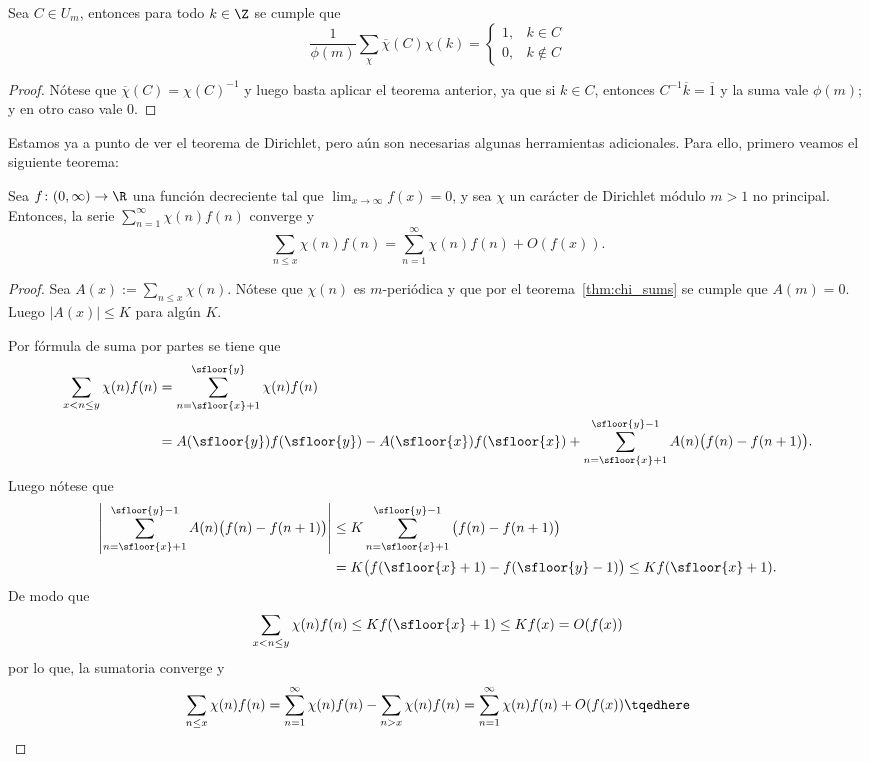 \documentclass[teoria-numeros.tex]{subfiles}
\begin{document}
\begin{thm}\label{thm:dirichlet_char_sum}
	Sea $C \in U_m$, entonces para todo $k\in\Z$ se cumple que
	$$ \frac{1}{\phi(m)}\sum_\chi \overline{\chi}(C) \chi(k) =
	\begin{cases}
		1, &k\in C \\
		0, &k\notin C
	\end{cases} $$
\end{thm}
\begin{proof}
	Nótese que $\overline\chi(C) = \chi(C)^{-1}$ y luego basta aplicar el teorema anterior, ya que si $k \in C$,
	entonces $C^{-1}\overline k = \overline 1$ y la suma vale $\phi(m)$; y en otro caso vale 0.
\end{proof}

Estamos ya a punto de ver el teorema de Dirichlet, pero aún son necesarias algunas herramientas adicionales.
Para ello, primero veamos el siguiente teorema:

\begin{thm}
	Sea $f\colon (0, \infty) \to \R$ una función decreciente tal que $\lim_{x\to\infty} f(x) = 0$, y sea $\chi$ un carácter de Dirichlet módulo $m>1$
	no principal. Entonces, la serie $\sum_{n=1}^\infty \chi(n)f(n)$ converge y
	$$ \sum_{n \le x} \chi(n)f(n) = \sum_{n=1}^\infty \chi(n)f(n) + O(f(x)). $$
\end{thm}
\begin{proof}
	Sea $A(x) := \sum_{n\le x} \chi(n)$.
	Nótese que $\chi(n)$ es $m$-periódica y que por el teorema~\ref{thm:chi_sums} se cumple que $A(m) = 0$.
	Luego $|A(x)| \le K$ para algún $K$.

	Por fórmula de suma por partes se tiene que
	\begin{align*}
		\sum_{x < n \le y} \chi(n)f(n) &= \sum_{n = \sfloor{x}+1}^{ \sfloor{y} } \chi(n)f(n) \\
		&= A(\sfloor{y})f(\sfloor{y}) - A(\sfloor{x})f(\sfloor{x}) + \sum_{n = \sfloor{x}+1}^{\sfloor{y}-1} A(n) \big( f(n) - f(n+1) \big).
	\end{align*}
	Luego nótese que
	\begin{align*}
		\left| \sum_{n = \sfloor{x}+1}^{\sfloor{y}-1} A(n) \big( f(n) - f(n+1) \big) \right|
		&\le K \sum_{n = \sfloor{x}+1}^{\sfloor{y}-1} \big( f(n) - f(n+1) \big) \\
		&= K \big( f(\sfloor{x}+1) - f(\sfloor{y}-1) \big) \le Kf(\sfloor{x} + 1).
	\end{align*}
	De modo que
	$$ \sum_{x < n \le y} \chi(n)f(n) \le Kf(\sfloor{x} + 1) \le Kf(x) = O(f(x)) $$
	por lo que, la sumatoria converge y
	\begin{equation}
		\sum_{n\le x} \chi(n)f(n) = \sum_{n=1}^\infty \chi(n)f(n) - \sum_{n>x} \chi(n)f(n) = \sum_{n=1}^\infty \chi(n)f(n) + O(f(x)) \tqedhere
	\end{equation}
\end{proof}
\end{document}

